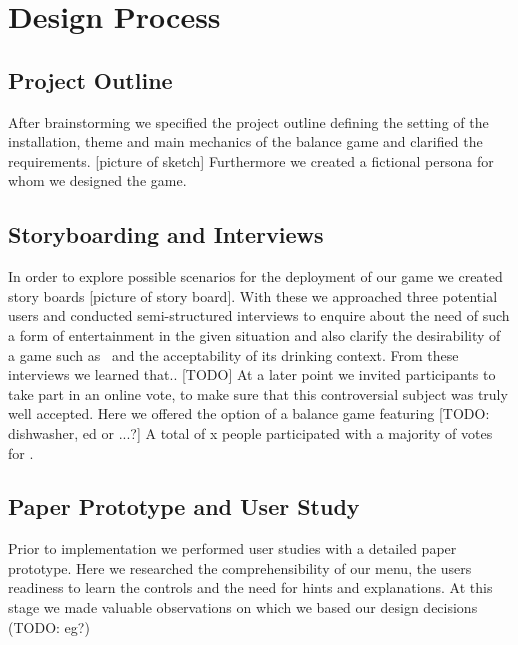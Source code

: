\documentclass{chi-ext}
\begin{document}
\section{Design Process}
\subsection{Project Outline}
After brainstorming we specified the project outline defining the setting of the installation, theme and main mechanics of the balance game and clarified the requirements. [picture of sketch]
Furthermore we created a fictional persona for whom we designed the game.
\subsection{Storyboarding and Interviews}
In order to explore possible scenarios for the deployment of our game we created story boards [picture of story board]. With these we approached three potential users and conducted semi-structured interviews to enquire about the need of such a form of entertainment in the given situation and also clarify the desirability of a  game such as \drunkened\ and the acceptability of its drinking context. From these interviews we learned that.. [TODO]
At a later point we invited participants to take part in an online vote, to make sure that this controversial subject was truly well accepted. Here we offered the option of a balance game featuring [TODO: dishwasher, ed or ...?] A total of x people participated with a majority of votes for \drunkened.
\subsection{Paper Prototype and User Study}
Prior to implementation we performed user studies with a detailed paper prototype. Here we researched the comprehensibility of our menu, the users readiness to learn the controls and the need for hints and explanations. At this stage we made valuable observations on which we based our design decisions (TODO: eg?)
\end{document}
